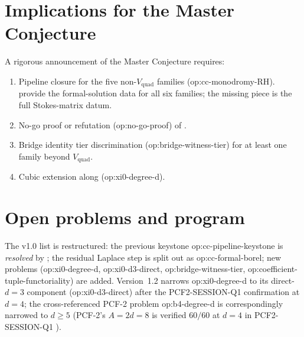 \documentclass[11pt,reqno]{amsart}
\theoremstyle{plain}
\theoremstyle{definition}
\theoremstyle{remark}
\newcommand{\Vquad}{V_{\mathrm{quad}}}
\begin{document}
\section{Implications for the Master Conjecture}
\label{sec:implications}

A rigorous announcement of the Master Conjecture requires:
\begin{enumerate}
\item Pipeline closure for the five non-$\Vquad$ families
(\textsf{op:cc-monodromy-RH}). 
provide the formal-solution data for all six families;
the missing piece is the full Stokes-matrix datum.
\item No-go proof or refutation (\textsf{op:no-go-proof})
of .
\item Bridge identity tier discrimination
(\textsf{op:bridge-witness-tier}) for at least one family
beyond $\Vquad$.
\item Cubic extension along
\cite{siarc_pcf2_v11, siarc_pcf2_program}
(\textsf{op:xi0-degree-d}).
\end{enumerate}

\section{Open problems and program}
\label{sec:open}

The v1.0 list is restructured: the previous keystone
\textsf{op:cc-pipeline-keystone} is \emph{resolved} by
; the residual Laplace step is split out
as \textsf{op:cc-formal-borel}; new problems
(\textsf{op:xi0-degree-d}, \textsf{op:xi0-d3-direct},
\textsf{op:bridge-witness-tier},
\textsf{op:coefficient-tuple-functoriality}) are added.
Version~1.2 narrows \textsf{op:xi0-degree-d} to its
direct-$d=3$ component (\textsf{op:xi0-d3-direct}) after the
PCF2-SESSION-Q1 confirmation at $d=4$; the cross-referenced
PCF-2 problem \textsf{op:b4-degree-d} \cite{siarc_pcf2_v11}
is correspondingly narrowed to $d \ge 5$ (PCF-2's
$A = 2d = 8$ is verified $60/60$ at $d=4$ in
PCF2-SESSION-Q1 \cite{siarc_pcf2_session_q1}).
\end{document}
